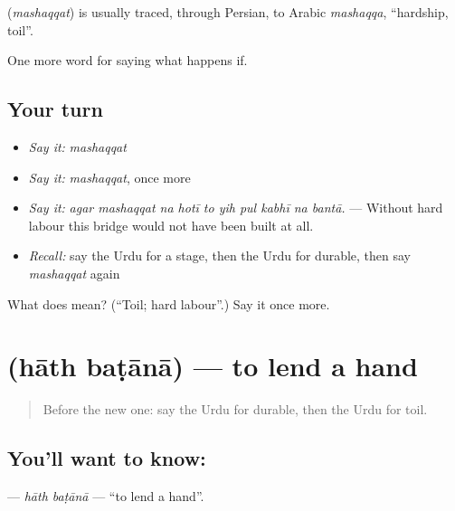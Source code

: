 \begin{cousinweb}
\textbf{} (\emph{mashaqqat}) is usually traced, through Persian, to Arabic \emph{mashaqqa}, \textquotedblleft{}hardship, toil\textquotedblright{}.
\end{cousinweb}

\begin{grammarlens}[title={What you've built}]
One more word for saying what happens if.
\end{grammarlens}

\subsection*{Your turn}
\begin{itemize}
\raggedright
  \item \emph{Say it:} \emph{mashaqqat}
  \item \emph{Say it:} \emph{mashaqqat}, once more
  \item \emph{Say it:} \emph{agar mashaqqat na hotī to yih pul kabhī na bantā.} — Without hard labour this bridge would not have been built at all.
  \item \emph{Recall:} say the Urdu for a stage, then the Urdu for durable, then say \emph{mashaqqat} again
\end{itemize}

\begin{tcolorbox}[breakable,colback=teal!4,colframe=teal!35!black,title={Before you move on}]
What does  mean? (\textquotedblleft{}Toil; hard labour\textquotedblright{}.) Say it once more.
\end{tcolorbox}
\section[\texorpdfstring{\ur{ہاتھ} \ur{بٹانا} (hāth baṭānā)}{ہاتھ بٹانا (hāth baṭānā)}]{  (hāth baṭānā) — to lend a hand}

\label{lesson:UR-C546-hath-batana}



\begin{quote}
Before the new one: say the Urdu for durable, then the Urdu for toil.
\end{quote}

\subsection*{You'll want to know:  }
\textbf{ } — \emph{hāth baṭānā} — \textquotedblleft{}to lend a hand\textquotedblright{}.

